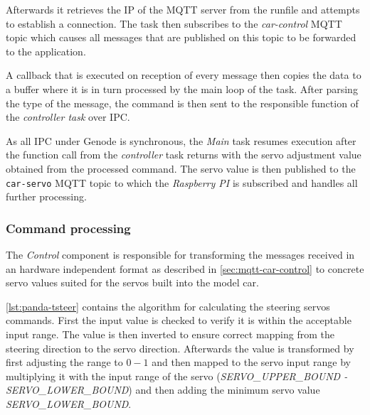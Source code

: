 Afterwards it retrieves the IP of the MQTT server from the runfile and attempts to establish a connection.
The task then subscribes to the \textit{car-control} MQTT topic which causes all messages that are published on this topic to be forwarded to the application.

A callback that is executed on reception of every message then copies the data to a buffer where it is in turn processed by the main loop of the task.
After parsing the type of the message, the command is then sent to the responsible function of the \textit{controller task} over IPC.

As all IPC under Genode is synchronous, the \textit{Main} task resumes execution after the function call from the \textit{controller} task returns with the servo adjustment value obtained from the processed command.
The servo value is then published to the \texttt{car-servo} MQTT topic to which the \textit{Raspberry PI} is subscribed and handles all further processing.


\subsubsection{Command processing}
\label{sec:panda-convert}
The \textit{Control} component is responsible for transforming the messages received in an hardware independent format as described in \autoref{sec:mqtt-car-control} to concrete servo values suited for the servos built into the model car.

\autoref{lst:panda-tsteer} contains the algorithm for calculating the steering servos commands.
First the input value is checked to verify it is within the acceptable input range.
The value is then inverted to ensure correct mapping from the steering direction to the servo direction.
Afterwards the value is transformed by first adjusting the range to $0-1$ and then mapped to the servo input range by multiplying it with the input range of the servo (\textit{SERVO\_UPPER\_BOUND - SERVO\_LOWER\_BOUND}) and then adding the minimum servo value \textit{SERVO\_LOWER\_BOUND}. \\


